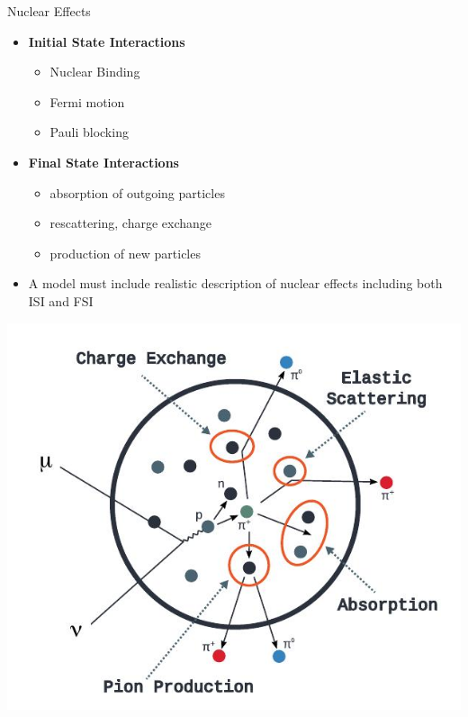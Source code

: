 \documentclass[9pt]{beamer}    %
\begin{document}
 \begin{frame}{Nuclear Effects}
 \begin{minipage}{0.6\textwidth}\raggedright
\begin{small}
 \begin{itemize}
  \item \textbf{Initial State Interactions}
  \begin{itemize}
   \item Nuclear Binding
   \item Fermi motion
   \item Pauli blocking
  \end{itemize}
 \end{itemize}

 \begin{itemize}
  \item \textbf{Final State Interactions}
  \begin{itemize}
  \item absorption of outgoing particles
   \item rescattering, charge exchange
   \item production of new particles
  \end{itemize}
 \end{itemize}
 \begin{itemize}
  \item A model must include realistic description of nuclear effects including both ISI and FSI
 \end{itemize}

\end{small}
\end{minipage}
\hfill%
  \noindent\begin{minipage}{0.38\textwidth}%
\includegraphics[scale=.30]{nuceff2.jpg}
\end{minipage}%
\end{frame}
\end{document}
